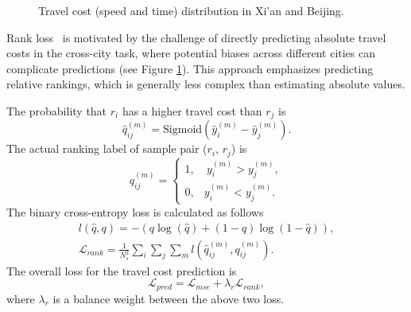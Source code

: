 \begin{figure}[t]
    \caption{Travel cost (speed and time) distribution in Xi'an and Beijing.}
    \label{fig:cost_distribution}
\end{figure}

Rank loss~\cite{ranknet} is motivated by the challenge of directly predicting absolute travel costs in the cross-city task, where potential biases across different cities can complicate predictions (see Figure \ref{fig:cost_distribution}). This approach emphasizes predicting relative rankings, which is generally less complex than estimating absolute values.

The probability that \(r_i\) has a higher travel cost than \(r_j\) is
\begin{equation}
\hat{q}_{ij}^{(m)} = \text{Sigmoid} \left( \hat{y}_i^{(m)} - \hat{y}_j^{(m)} \right).
\end{equation}
The actual ranking label of sample pair ($r_i$, $r_j$) is 
\begin{equation}
    q_{ij}^{(m)} = 
    \begin{cases}
        1, & \ y_i^{(m)} > y_j^{(m)}, \\
        0, & y_i^{(m)} < y_j^{(m)}.
    \end{cases}
\end{equation}
The binary cross-entropy loss is calculated as follows
\begin{equation}
\begin{gathered}
    l \left( \hat{q}, q \right) = - \left( q \log (\hat{q}) + (1 - q) \log (1 - \hat{q}) \right), \\
    \mathcal{L}_{rank} = \frac{1}{N_s^2} \sum_{i} \sum_{j} \sum_{m} l \left( \hat{q}_{ij}^{(m)}, q_{ij}^{(m)}\right).
\end{gathered}
\end{equation}
The overall loss for the travel cost prediction is
\begin{equation}
    \mathcal{L}_{pred} = \mathcal{L}_{mse} + \lambda_r \mathcal{L}_{rank},
\end{equation}
where $\lambda_r$ is a balance weight between the above two loss.

